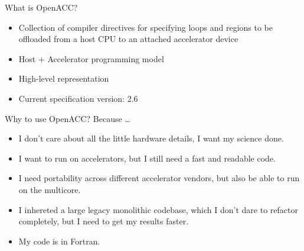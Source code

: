 \documentclass[12pt,aspectratio=169]{beamer}
\begin{document}

\begin{frame}{What is OpenACC?}
  \begin{itemize}
  \item Collection of compiler directives for specifying loops and regions to be
    offloaded from a host CPU to an attached accelerator device
  \item Host + Accelerator programming model
  \item High-level representation
  \item Current specification version: 2.6
  \end{itemize}
\end{frame}

\begin{frame}{Why to use OpenACC?}
  Because \dots
  \vspace\baselineskip
  \begin{itemize}
  \item I don't care about all the little hardware details, I want my science done.
  \item I want to run on accelerators, but I still need a fast and readable code.
  \item I need portability across different accelerator vendors, but also be able to run on the multicore.
  \item I inhereted a large legacy monolithic codebase, which I don't dare to
    refactor completely, but I need to get my results faster.
  \item My code is in Fortran.
  \end{itemize}
\end{frame}
\end{document}
